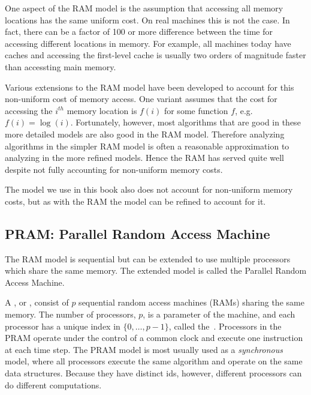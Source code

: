 

\begin{remark}
One aspect of the RAM model is the assumption that
accessing all memory locations has the same uniform cost.  On real
machines this is not the case.  In fact, there can be a factor of 100
or more
difference between the time for accessing different locations in
memory.  For example, all machines today have caches and accessing the
first-level cache is usually two orders of magnitude faster than
accessting main memory.

Various extensions to the RAM model have been developed to account for
this non-uniform cost of memory access.  One variant assumes that the
cost for accessing the $i^{th}$ memory location is $f(i)$ for some
function $f$, e.g. $f(i) = \log(i)$.  
%
Fortunately, however, most algorithms that are good in these more
detailed models are also good in the RAM model.
%
Therefore analyzing algorithms in the simpler RAM model is often a
reasonable approximation to analyzing in the more refined models.
Hence the RAM has served quite well despite not fully accounting for
non-uniform memory costs.

The model we use in this book also does not account for non-uniform
memory costs, but as with the RAM the model can be refined to account
for it.
\end{remark} 

\subsection{PRAM: Parallel Random Access Machine}
\begin{gram}
The RAM model is sequential but can be extended to use multiple processors
which share the same memory.  The extended model is called the
Parallel Random Access Machine.
\end{gram}

\begin{gram}
A , or , 
consist of $p$ sequential random access machines
(RAMs) sharing  the same memory.
%
The number of processors, $p$, is a parameter of the machine,
and each processor has a unique index in $\{0, \dots, p-1\}$,
called the~.
%
Processors in the PRAM operate under the control of a common
clock and execute one instruction at each time step.
%
The PRAM model is most usually used as a {\em synchronous} model,
where all processors execute the same algorithm and operate on the same
data structures.
%
Because they have distinct ids, however, different processors can do
different computations.
\end{gram}

